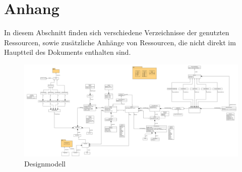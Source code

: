 \documentclass{article}
\newcommand{\listofcode}{
  \doublespacing
  \listof{Code}{Quelltextverzeichnis}
}
\begin{document}

\newpage

\section{Anhang}

In diesem Abschnitt finden sich verschiedene Verzeichnisse der genutzten 
Ressourcen, sowie zusätzliche Anhänge von Ressourcen, die nicht direkt im 
Hauptteil des Dokuments enthalten sind.

\listoffigures

\newpage

\begin{figure} [ht]
  \centering
  \includegraphics[angle=90,width=.65\linewidth]{design_full.png}
  \caption{Designmodell}
  \label{pic:design}
\end{figure}

\end{document}
